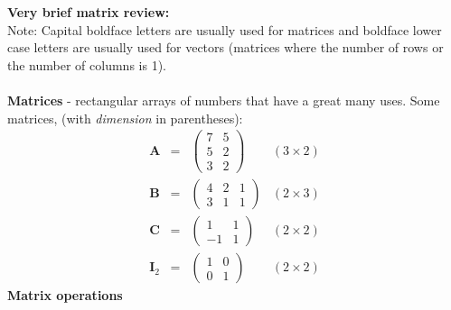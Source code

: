 \textbf{Very brief matrix review:}\\
Note: Capital boldface letters are usually used for matrices and boldface lower case letters are usually used for vectors (matrices where the number of rows or the number of columns is 1).\\~\\
\textbf{Matrices} - rectangular arrays of numbers that have a great many uses.  Some matrices, (with {\em dimension} in parentheses):
\[
\begin{array}{cccc}
\textbf{A}&=&\left(\begin{array}{cc} 7 & 5 \\ 5 & 2 \\ 3 & 2 \end{array}\right)  & (3 \times 2) \\
\textbf{B}&=&\left(\begin{array}{ccc} 4 & 2 & 1 \\ 3 & 1 & 1 \end{array}\right)  & (2 \times 3)  \\
\textbf{C}&=&\left(\begin{array}{cc} 1 & 1 \\ -1 & 1 \end{array}\right) & (2 \times 2) \\
\textbf{I}_2&=&\left(\begin{array}{cc} 1 & 0 \\ 0 & 1 \end{array}\right) & (2 \times 2)
\end{array}
\]
\textbf{Matrix operations}
